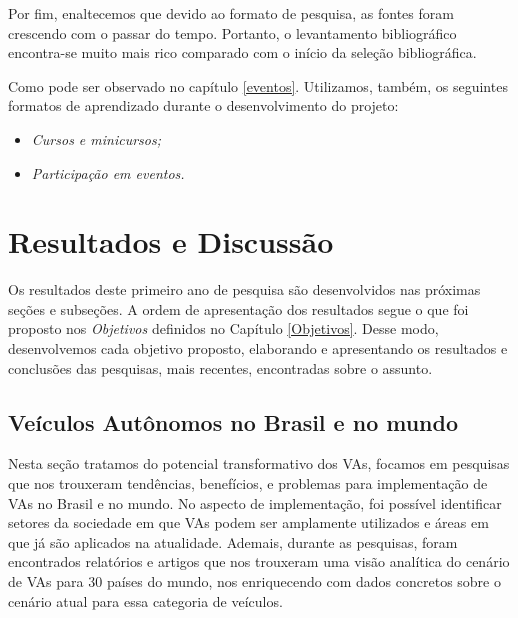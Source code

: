Por fim, enaltecemos que devido ao formato de pesquisa, as fontes foram crescendo com o passar do tempo. Portanto, o levantamento bibliográfico encontra-se muito mais rico comparado com o início da seleção bibliográfica.

\vspace {0,5cm}

Como pode ser observado no capítulo \ref{eventos}. Utilizamos, também, os seguintes formatos de aprendizado durante o desenvolvimento do projeto:
\begin{itemize}
\item \textit{Cursos e minicursos;}
\item \textit{Participação em eventos.}
\end{itemize}
\newpage

\chapter{Resultados e Discussão} \label{resultados}

Os resultados deste primeiro ano de pesquisa são desenvolvidos nas próximas seções e subseções. A ordem de apresentação dos resultados segue o que foi proposto nos \textit{Objetivos} definidos no Capítulo \ref{Objetivos}. Desse modo, desenvolvemos cada objetivo proposto, elaborando e apresentando os resultados e conclusões das pesquisas, mais recentes, encontradas sobre o assunto.

\section{Veículos Autônomos no Brasil e no mundo}
Nesta seção tratamos do potencial transformativo dos VAs, focamos em pesquisas que nos trouxeram tendências, benefícios, e problemas para implementação de VAs no Brasil e no mundo. No aspecto de implementação, foi possível identificar setores da sociedade em que VAs podem ser amplamente utilizados e áreas em que já são aplicados na atualidade. Ademais, durante as pesquisas, foram encontrados relatórios e artigos que nos trouxeram uma visão analítica do cenário de VAs para 30 países do mundo, nos enriquecendo com dados concretos sobre o cenário atual para essa categoria de veículos. 

